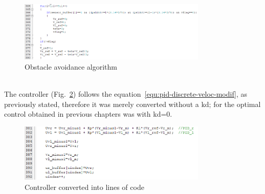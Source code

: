 \begin{figure}[!htbp]
\centering
       \includegraphics[page=1,width=0.8\textwidth]{img/odometryCode.png} 
\caption{Obstacle avoidance algorithm}
\label{fig:odomCode}
\end{figure}
\\
The controller (Fig.~\ref{fig:controllerCode}) follows the equation~\ref{equ:pid-discrete-veloc-modif}, as previously stated, therefore it was merely converted without a kd; for the optimal control obtained in previous chapters was with kd=0.
\begin{figure}[!htbp]
\centering
       \includegraphics[page=1,width=0.8\textwidth]{img/controllerCode.png} 
\caption{Controller converted into lines of code}
\label{fig:controllerCode}
\end{figure}